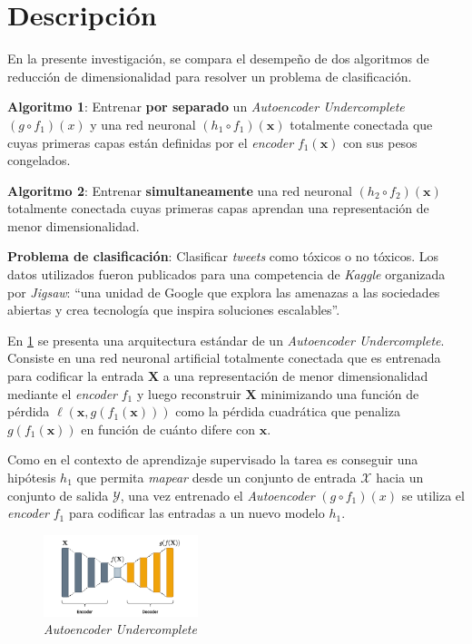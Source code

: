 \section*{Descripción}

En la presente investigación, se compara el desempeño de dos algoritmos de reducción de dimensionalidad para resolver un problema de clasificación.

\textbf{Algoritmo 1}: Entrenar \textbf{por separado} un \textit{Autoencoder Undercomplete} $(g \circ f_1)(x)$ y una red neuronal $(h_1 \circ f_1)(\bm{x})$ totalmente conectada que cuyas primeras capas están definidas por el \textit{encoder} $f_1(\bm{x})$ con sus pesos congelados.

\textbf{Algoritmo 2}: Entrenar \textbf{simultaneamente} una red neuronal $(h_2 \circ f_2)(\bm{x})$ totalmente conectada cuyas primeras capas aprendan una representación de menor dimensionalidad.

\textbf{Problema de clasificación}: Clasificar \textit{tweets} como tóxicos o no tóxicos. Los datos utilizados fueron publicados para una competencia de \textit{Kaggle} \cite{jigsaw-toxic-comment-classification-challenge} organizada por \textit{Jigsaw}: ``una unidad de Google que explora las amenazas a las sociedades abiertas y crea tecnología que inspira soluciones escalables''.

En \ref{fig:autoencoder} se presenta una arquitectura estándar de un \textit{Autoencoder Undercomplete}. Consiste en una red neuronal artificial totalmente conectada que es entrenada para codificar la entrada $\mathbf{X}$ a una representación de menor dimensionalidad mediante el \textit{encoder} $f_1$ y luego reconstruir $\mathbf{X}$ minimizando una función de pérdida $\ell(\bm{x},g(f_1(\bm{x})))$ como la pérdida cuadrática que penaliza $g(f_1(\bm{x}))$ en función de cuánto difere con $\bm{x}$.

Como en el contexto de aprendizaje supervisado la tarea es conseguir una hipótesis $h_1$ que permita \textit{mapear} desde un conjunto de entrada $\mathcal{X}$ hacia un conjunto de salida $\mathcal{Y}$, una vez entrenado el \textit{Autoencoder} $(g \circ f_1)(x)$ se utiliza el \textit{encoder} $f_1$ para codificar las entradas a un nuevo modelo $h_{1}$. 

\begin{figure}[h]
\centering
\includegraphics[width=0.4\textwidth]{autoencoder}
\caption{\label{fig:autoencoder} \textit{Autoencoder Undercomplete}}
\end{figure}


